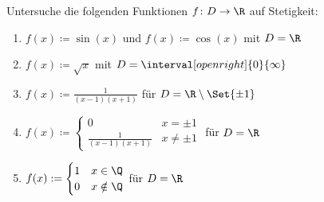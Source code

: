 \begin{prob}
  Untersuche die folgenden Funktionen $f \colon D \to \R$ auf Stetigkeit:
  \begin{enumerate}[label=(\alph*)]
  \item $f(x) \coloneqq \sin(x)$ und $f(x) \coloneqq \cos(x)$ mit $D = \R$
  \item $f(x) \coloneqq \sqrt{x}$ mit $D = \interval[open right]{0}{\infty}$
  \item $f(x) \coloneqq \frac{1}{(x-1)(x+1)}$ für $D = \R \setminus \Set{\pm 1}$
  \item $\displaystyle f(x) \coloneqq
    \begin{cases}
      0                    & x = \pm 1 \\
      \frac{1}{(x-1)(x+1)} & x \neq \pm 1
    \end{cases}$ \quad für $D = \R$
  \item $\displaystyle f(x) :=
    \begin{cases}
      1 & x \in \Q \\
      0 & x \notin \Q
    \end{cases}$ \quad für $D = \R$
  \end{enumerate}
\end{prob}
